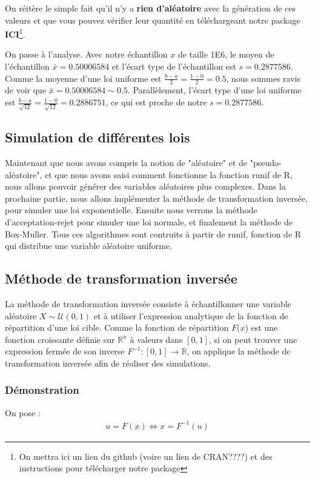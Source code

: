 \documentclass[10pt]{article} %
\begin{document}
On réitère le simple fait qu'il n'y a \textbf{rien d'aléatoire} avec la génération de ces valeurs et que vous pouvez vérifier leur quantité en
téléchargeant notre package \textbf{ICI}\footnote{On mettra ici un lien du github (voire un lien de CRAN????) et des instructions pour télécharger notre package}.

On passe à l'analyse. Avec notre échantillon $x$ de taille 1E6, le moyen de l'échantillon $\bar x = 0.50006584$ et l'écart type de l'échantillon est $s = 0.2877586$.
Comme la moyenne d'une loi uniforme est $\frac{b - a}{2} = \frac{1 - 0}{2} = 0.5$, nous sommes ravis de voir que $\bar x = 0.50006584 \sim 0.5$. Parallèlement, l'écart type
d'une loi uniforme est $\frac{b - a}{\sqrt{12}} = \frac{1 - 0}{\sqrt{12}} = 0.2886751$, ce qui est proche de notre $s = 0.2877586$.


\subsection{Simulation de différentes lois}


Maintenant que nous avons compris la notion de "aléatoire" et de "pseudo-aléatoire", et que nous avons saisi comment fonctionne la fonction runif de R, nous allons pouvoir générer des variables aléatoires plus complexes. Dans la prochaine partie, nous allons implémenter la méthode de transformation inversée, pour simuler une loi exponentielle. Ensuite nous verrons la méthode d'acceptation-rejet pour simuler une loi normale, et finalement la méthode de Box-Muller. Tous ces  algorithmes sont contruits à partir de runif, fonction de R qui distribue une variable aléatoire uniforme.

\subsection{Méthode de transformation inversée}

La méthode de transformation inversée consiste à échantillonner une variable aléatoire $X \sim \mathcal{U}(0, 1)$ et à utiliser l'expression analytique
de la fonction de répartition d'une loi cible. Comme la fonction de répartition $F(x$) est une fonction croissante définie sur $\mathbb{R}^n$ à valeurs dans
$[0, 1]$, si on peut trouver une expression fermée de son inverse $F^{-1} : [0, 1] \longrightarrow \mathbb{R}$, on applique la méthode de transformation inversée
afin de réaliser des simulations.

\subsubsection{Démonstration}
On pose :
\begin{align}
u = F(x) \Leftrightarrow x = F^{-1}(u)
\end{align}
\end{document}
